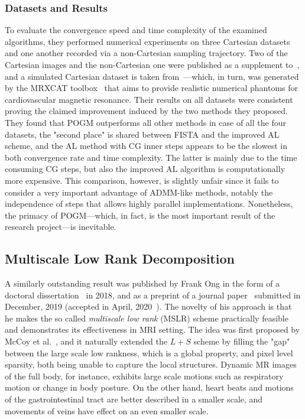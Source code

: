 \subsubsection{Datasets and Results}
To evaluate the convergence speed and time complexity of the examined algorithms, they performed numerical experiments on three Cartesian datasets and one another recorded via a non-Cartesian sampling trajectory. Two of the Cartesian images and the non-Cartesian one were published as a supplement to~\cite{otazo_low-rank_2015}, and a simulated Cartesian dataset is taken from~\cite{nakarmi_accelerating_2016}---which, in turn, was generated by the MRXCAT toolbox~\cite{wissmann_mrxcat_2014} that aims to provide realistic numerical phantoms for cardiovascular magnetic resonance. Their results on all datasets were consistent proving the claimed improvement induced by the two methods they proposed. They found that POGM outperforms all other methods in case of all the four datasets, the "second place" is shared between FISTA and the improved AL scheme, and the AL method with CG inner steps appears to be the slowest in both convergence rate and time complexity. The latter is mainly due to the time consuming CG steps, but also the improved AL algorithm is computationally more expensive. This comparison, however, is slightly unfair since it fails to consider a very important advantage of ADMM-like methods, notably the independence of steps that allows highly parallel implementations. Nonetheless, the primacy of POGM---which, in fact, is the most important result of the research project---is inevitable.

\subsection{Multiscale Low Rank Decomposition}

A similarly outstanding result was published by Frank Ong in the form of a doctoral dissertation~\cite{ong_low_2018} in 2018, and as a preprint of a journal paper~\cite{ong_extreme_2020} submitted in December, 2019 (accepted in April, 2020~\cite{ong_extreme_2020-1}). The novelty of his approach is that he makes the so called \textit{multiscale low rank} (MSLR) scheme practically feasible and demonstrates its effectiveness in MRI setting. The idea was first proposed by McCoy et al.~\cite{mccoy_achievable_2013, mccoy_convexity_2014, mccoy_sharp_2014}, and it naturally extended the $L+S$ scheme by filling the "gap" between the large scale low rankness, which is a global property, and pixel level sparsity, both being unable to capture the local structures. Dynamic MR images of the full body, for instance, exhibits large scale motions such as respiratory motion or change in body posture. On the other hand, heart beats and motions of the gastrointestinal tract are better described in a smaller scale, and movements of veins have effect on an even smaller scale.


